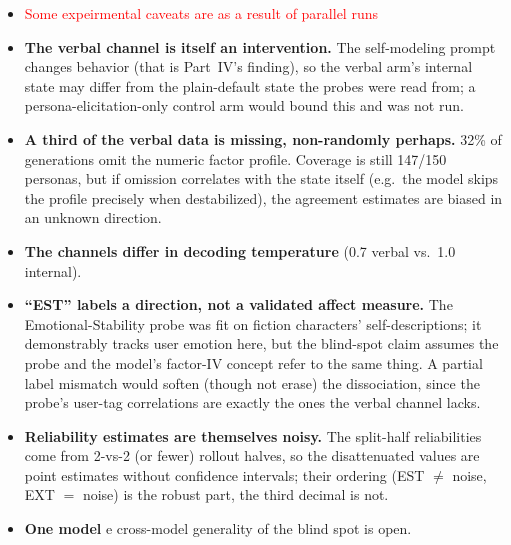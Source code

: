 \documentclass[11pt]{article}
\begin{document}
\begin{itemize}
\item \textcolor{red}{Some expeirmental caveats are as a result of parallel runs}
  \item \textbf{The verbal channel is itself an intervention.} The
        self-modeling prompt changes behavior (that is Part~IV's finding), so
        the verbal arm's internal state may differ from the plain-default
        state the probes were read from; a persona-elicitation-only control
        arm would bound this and was not run.
  \item \textbf{A third of the verbal data is missing, non-randomly perhaps.}
        32\% of generations omit the numeric factor profile. Coverage is
        still 147/150 personas, but if omission correlates with the state
        itself (e.g.\ the model skips the profile precisely when destabilized),
        the agreement estimates are biased in an unknown direction.
  \item \textbf{The channels differ in decoding temperature} (0.7 verbal vs.\
        1.0 internal).
  \item \textbf{``EST'' labels a direction, not a validated affect measure.}
        The Emotional-Stability probe was fit on fiction characters'
        self-descriptions; it demonstrably tracks user emotion here, but the
        blind-spot claim assumes the probe and the model's factor-IV concept
        refer to the same thing. A partial label mismatch would soften
        (though not erase) the dissociation, since the probe's user-tag
        correlations are exactly the ones the verbal channel lacks.
  \item \textbf{Reliability estimates are themselves noisy.} The split-half
        reliabilities come from 2-vs-2 (or fewer) rollout halves, so the
        disattenuated values are point estimates without confidence
        intervals; their ordering (EST $\ne$ noise, EXT $=$ noise) is the
        robust part, the third decimal is not.
  \item \textbf{One model} e cross-model generality of the blind spot is open.
\end{itemize}
\end{document}
